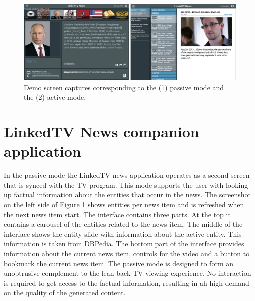 \documentclass{llncs}
\begin{document}

\begin{figure}[t!]
\centering
\includegraphics[width=1\textwidth]{figure/DemoScreen}
\caption{Demo screen captures corresponding to the (1) passive mode and the (2) active mode.}
\label{fig:interface}%
\end{figure}

\section{LinkedTV News companion application}
\label{sec:tvnews}

In the passive mode the LinkedTV news application operates as a second screen that is synced with the TV program. This mode supports the user with looking up factual information about the entities that occur in the news. The screenshot on the left side of Figure \ref{fig:interface} shows entities per news item and is refreshed when the next news item start. The interface contains three parts. At the top it contains a carousel of the entities related to the news item. The middle of the interface shows the entity slide with information about the active entity. This information is taken from DBPedia. The bottom part of the interface provides information about the current news item, controls for the video and a button to bookmark the current news item. The passive mode is designed to form an unobtrusive complement to the lean back TV viewing experience. No interaction is required to get access to the factual information, resulting in ah high demand on the quality of the generated content. 
\end{document}
